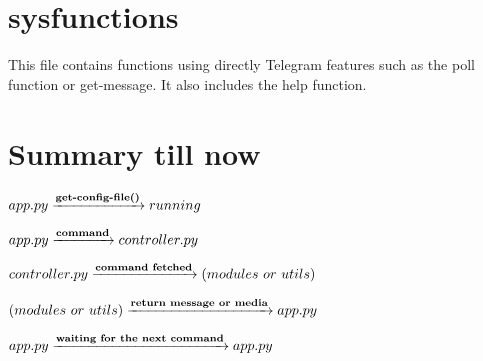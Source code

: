 \documentclass{article}
\begin{document}
\section{sysfunctions}
This file contains functions using directly Telegram features such as the poll function or get-message. It also includes the help function.

\section{Summary till now}
\begin{center} $app.py \xrightarrow{\text{\textbf{get-config-file()}}} running$ \end{center}
\begin{center} $app.py \xrightarrow{\text{\textbf{command}}} controller.py$ \end{center}
\begin{center} $controller.py \xrightarrow{\text{\textbf{command fetched}}} (modules \ or  \ utils)$ \end{center}
\begin{center} $(modules \ or \ utils) \xrightarrow{\text{\textbf{return message or media}}} app.py$ \end{center}
\begin{center} $app.py \xrightarrow{\text{\textbf{waiting for the next command}}} app.py$ \end{center}

\end{document}
